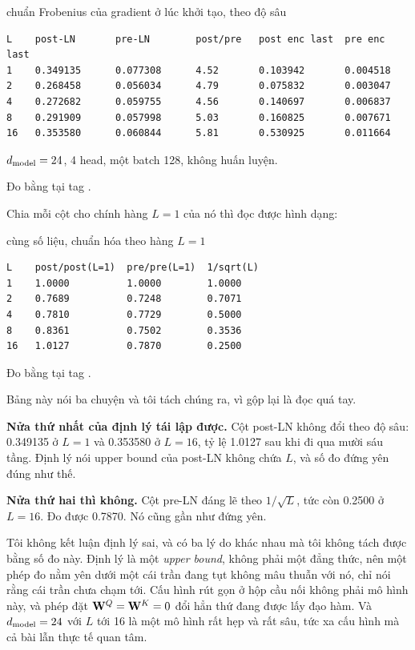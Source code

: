 \begin{measured}{chuẩn Frobenius của gradient ở lúc khởi tạo, theo độ sâu}
\begin{verbatim}
L    post-LN       pre-LN        post/pre   post enc last  pre enc last
1    0.349135      0.077308      4.52       0.103942       0.004518
2    0.268458      0.056034      4.79       0.075832       0.003047
4    0.272682      0.059755      4.56       0.140697       0.006837
8    0.291909      0.057998      5.03       0.160825       0.007671
16   0.353580      0.060844      5.81       0.530925       0.011664
\end{verbatim}

\(d_{\mathrm{model}} = 24\), 4 head, một batch 128, không huấn luyện.

Đo bằng  tại tag .
\end{measured}

Chia mỗi cột cho chính hàng \(L = 1\) của nó thì đọc được hình dạng:

\begin{measured}{cùng số liệu, chuẩn hóa theo hàng \(L = 1\)}
\begin{verbatim}
L    post/post(L=1)  pre/pre(L=1)  1/sqrt(L)
1    1.0000          1.0000        1.0000
2    0.7689          0.7248        0.7071
4    0.7810          0.7729        0.5000
8    0.8361          0.7502        0.3536
16   1.0127          0.7870        0.2500
\end{verbatim}

Đo bằng  tại tag .
\end{measured}

%
Bảng này nói ba chuyện và tôi tách chúng ra, vì gộp lại là đọc quá tay.

\textbf{Nửa thứ nhất của định lý tái lập được.} Cột post-LN không đổi theo độ
sâu: 0.349135 ở \(L = 1\) và 0.353580 ở \(L = 16\), tỷ lệ 1.0127 sau khi đi qua
mười sáu tầng. Định lý nói upper bound của post-LN không chứa \(L\), và số đo đứng yên
đúng như thế.

\textbf{Nửa thứ hai thì không.} Cột pre-LN đáng lẽ theo \(1/\sqrt{L}\), tức còn
0.2500 ở \(L = 16\). Đo được 0.7870. Nó cũng gần như đứng yên.

Tôi không kết luận định lý sai, và có ba lý do khác nhau mà tôi không tách được
bằng số đo này. Định lý là một \emph{upper bound}, không phải một đẳng thức, nên
một phép đo nằm yên dưới một cái trần đang tụt không mâu thuẫn với nó, chỉ nói
rằng cái trần chưa chạm tới. Cấu hình rút gọn ở hộp cầu nối không phải mô hình
này, và phép đặt \(\mathbf{W}^Q = \mathbf{W}^K = 0\) đổi hẳn thứ đang được lấy đạo
hàm. Và \(d_{\mathrm{model}} = 24\) với \(L\) tới 16 là một mô hình rất hẹp và rất sâu, tức
xa cấu hình mà cả bài lẫn thực tế quan tâm.

